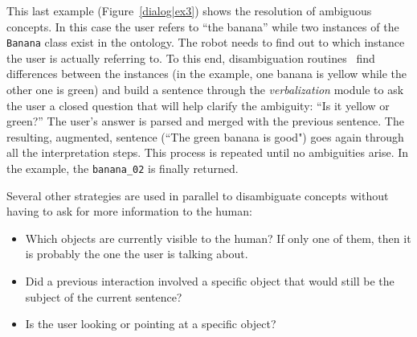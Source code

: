 \documentclass[twocolumn]{svjour3}
\newcommand{\concept}[1]{{\footnotesize \texttt{#1}}}
\begin{document}
This last example (Figure~\ref{dialog|ex3}) shows the resolution of ambiguous
concepts. In this case the user refers to ``the banana'' while two instances of 
the \concept{Banana} class exist in the ontology. The robot needs to find out 
to which instance the user is actually referring to. To this end, 
disambiguation routines~\cite{Ros2010b} find differences between the instances 
(in the example, one banana is yellow while the other one is green) and build a 
sentence through the \emph{verbalization} module to ask the user a closed 
question that will help clarify the ambiguity: ``Is it yellow or green?'' The 
user's answer is parsed and merged with the previous sentence. The resulting, 
augmented, sentence (``The green banana is good") goes again through all 
the interpretation steps. This process is repeated until no ambiguities arise. 
In the example, the \concept{banana\_02} is finally returned.


Several other strategies are used in parallel to disambiguate concepts without
having to ask for more information to the human:

\begin{itemize}
	\item Which objects are currently visible to the human? If only one of
	them, then it is probably the one the user is talking about. 
	\item Did a previous interaction involved a specific object that would
	still be the subject of the current sentence?
	\item Is the user looking or pointing at a specific object?
\end{itemize}

\end{document}
